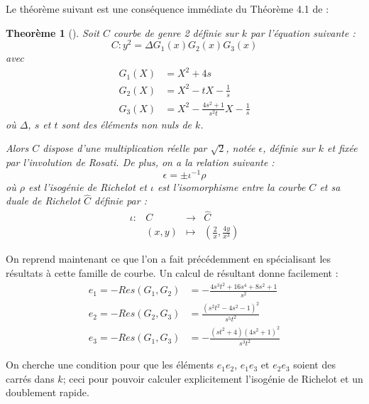 \documentclass[a4paper,12pt]{article}
\newtheorem{theoreme}{Theorème}[section]
\theoremstyle{definition}
\theoremstyle{remark}
\numberwithin{equation}{section}
\begin{document}
Le théorème suivant est une conséquence immédiate du Théorème 4.1 de \citep{bending} :
\begin{theoreme}[\citet{bending}]
\label{bending}
Soit $C$ courbe de genre 2 définie sur $k$ par l'équation suivante :
$$C : y^2 = \Delta G_1(x)G_2(x)G_3(x)$$
avec
\begin{align*}
G_1(X) &= X^2 + 4s \\
G_2(X) &= X^2 - tX - \frac{1}{s} \\
G_3(X) &= X^2 - \frac{4s^2+1}{s^2t}X - \frac{1}{s}
\end{align*}
où $\Delta$, $s$ et $t$ sont des éléments non nuls de $k$.

Alors $C$ dispose d'une multiplication réelle par $\sqrt2$, notée $\epsilon$, définie sur $k$ et fixée par l'involution de Rosati. De plus, on a la relation suivante :
$$\epsilon = \pm \iota^{-1}\rho$$
où $\rho$ est l'isogénie de Richelot et $\iota$ est l'isomorphisme entre la courbe $C$ et sa duale de Richelot $\hat{C}$ définie par :
\begin{equation*}
\begin{array}{lrcl}
\iota :&C & \longrightarrow & \hat{C} \\
& (x,y) & \longmapsto & (\frac{2}{x},\frac{4y}{x^3})
\end{array}
\end{equation*}
%
\end{theoreme}

On reprend maintenant ce que l'on a fait précédemment en spécialisant les résultats à cette famille de courbe. Un calcul de résultant donne facilement :
\begin{align*}
e_1 = -Res(G_1,G_2) &= -\frac{4s^3t^2 + 16s^4 + 8s^2 + 1}{s^2} \\
e_2 = -Res(G_2,G_3) &= \frac{(s^2t^2 - 4s^2 - 1)^2}{s^5t^2} \\
e_3 = -Res(G_1,G_3) &= -\frac{(st^2 + 4)(4s^2 + 1)^2}{s^3t^2}
\end{align*}

On cherche une condition pour que les éléments $e_1e_2$, $e_1e_3$ et $e_2e_3$ soient des carrés dans $k$; ceci pour pouvoir calculer explicitement l'isogénie de Richelot et un doublement rapide.
\end{document}
